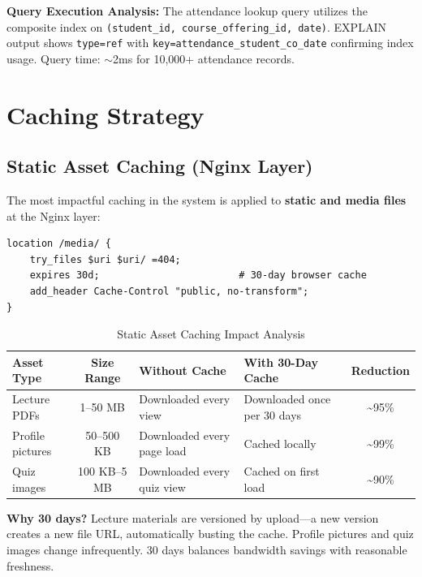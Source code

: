 \textbf{Query Execution Analysis:} The attendance lookup query utilizes the composite index on \texttt{(student\_id, course\_offering\_id, date)}. EXPLAIN output shows \texttt{type=ref} with \texttt{key=attendance\_student\_co\_date} confirming index usage. Query time: $\sim$2ms for 10,000+ attendance records.

\section{Caching Strategy}
\label{sec:caching}

\subsection{Static Asset Caching (Nginx Layer)}

The most impactful caching in the system is applied to \textbf{static and media files} at the Nginx layer:

\begin{lstlisting}[float, language=nginx, caption=Media File Caching Configuration]
location /media/ {
    try_files $uri $uri/ =404;
    expires 30d;                        # 30-day browser cache
    add_header Cache-Control "public, no-transform";
}
\end{lstlisting}

\begin{table}[H]
    \centering
    \renewcommand{\arraystretch}{1.3}
    \small
    \begin{tabular}{|l|c|p{2.5cm}|p{2.5cm}|c|}
        \hline
        \textbf{Asset Type} & \textbf{Size Range} & \textbf{Without Cache} & \textbf{With 30-Day Cache} & \textbf{Reduction} \\
        \hline
        Lecture PDFs & 1--50 MB & Downloaded every view & Downloaded once per 30 days & \textasciitilde95\% \\
        \hline
        Profile pictures & 50--500 KB & Downloaded every page load & Cached locally & \textasciitilde99\% \\
        \hline
        Quiz images & 100 KB--5 MB & Downloaded every quiz view & Cached on first load & \textasciitilde90\% \\
        \hline
    \end{tabular}
    \caption{Static Asset Caching Impact Analysis}
    \label{tab:caching-impact}
\end{table}

\textbf{Why 30 days?} Lecture materials are versioned by upload---a new version creates a new file URL, automatically busting the cache. Profile pictures and quiz images change infrequently. 30 days balances bandwidth savings with reasonable freshness.

